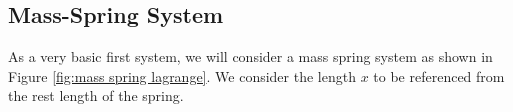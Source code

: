 \documentclass[12pt]{report}
\begin{document}
\subsection{Mass-Spring System}
As a very basic first system, we will consider a mass spring system as shown in Figure \ref{fig:mass spring lagrange}. We consider the length $x$ to be referenced from the rest length of the spring.
\begin{figure}[ht]

\centering


\begin{tikzpicture}[x=0.75pt,y=0.75pt,yscale=-1,xscale=1]


\end{tikzpicture}
\end{figure}
\end{document}
